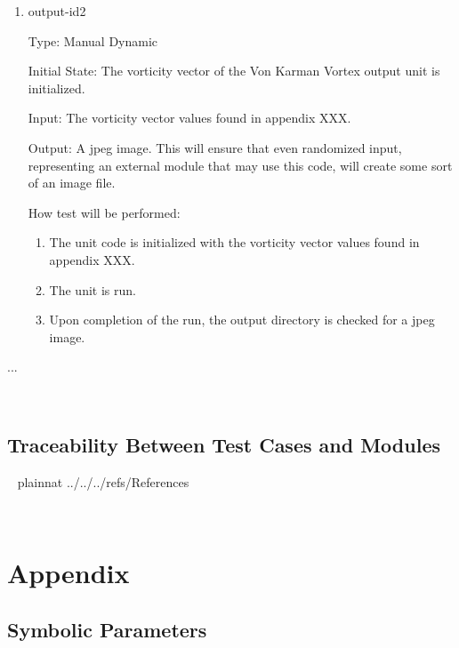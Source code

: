 \documentclass[12pt, titlepage]{article}
\begin{document}
\begin{enumerate}
\item{output-id2\\}

Type: Manual Dynamic
					
Initial State: The vorticity vector of the Von Karman Vortex output unit is initialized.
					
Input: The vorticity vector values found in appendix XXX.
					
Output: A jpeg image. This will ensure that even randomized input, representing an external module that may use this code, will create some sort of an image file.
					
How test will be performed: 
\begin{enumerate}
\item The unit code is initialized with the vorticity vector values found in appendix XXX.
\item The unit is run.
\item Upon completion of the run, the output directory is checked for a jpeg image.
\end{enumerate}

\end{enumerate}

...

~\newpage

\subsection{Traceability Between Test Cases and Modules}


~\newpage
\clearpage
 {plainnat}
 {../../../refs/References}

~\newpage

\section{Appendix}


\subsection{Symbolic Parameters}

\end{document}
